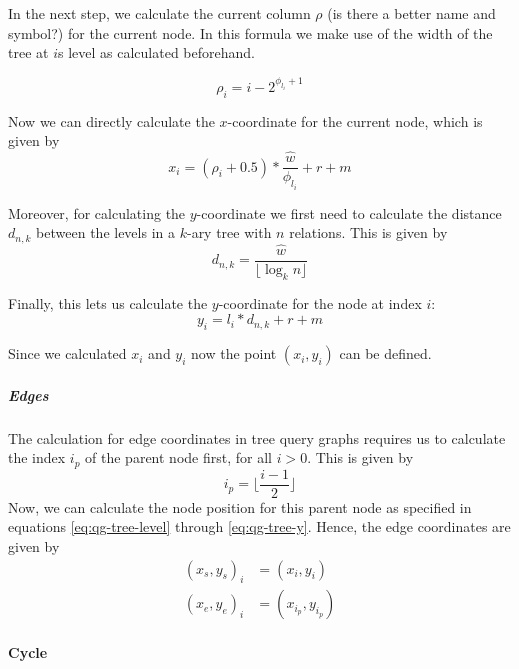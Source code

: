 In the next step, we calculate the current column $\rho$ (is there a better name and symbol?) for the current node. In this formula we make use of the width of the tree at $i$s level as calculated beforehand.

\begin{equation}
    \rho_{i} = i - 2^{\phi_{l_i} + 1}
\end{equation}

Now we can directly calculate the $x$-coordinate for the current node, which is given by
\begin{equation}
    x_i = (\rho_{i} + 0.5) * \frac{\hat{w}}{\phi_{l_i}} + r + m
\end{equation}

Moreover, for calculating the $y$-coordinate we first need to calculate the distance $d_{n,k}$ between the levels in a $k$-ary tree with $n$ relations. This is given by
\begin{equation}
    d_{n,k} = \frac{\hat{w}}{\lfloor \log_k{n} \rfloor}
\end{equation}

Finally, this lets us calculate the $y$-coordinate for the node at index $i$:
\begin{equation}
    \label{eq:qg-tree-y}
    y_i = l_i * d_{n,k} + r + m
\end{equation}

Since we calculated $x_i$ and $y_i$ now the point $(x_i, y_i)$ can be defined.

\subparagraph{Edges}
The calculation for edge coordinates in tree query graphs requires us to calculate the index $i_p$ of the parent node first, for all $i > 0$. This is given by 
\begin{equation}
    i_p = \lfloor \frac{i-1}{2} \rfloor
\end{equation}
Now, we can calculate the node position for this parent node as specified in equations \ref{eq:qg-tree-level} through \ref{eq:qg-tree-y}. Hence, the edge coordinates are given by 
\begin{equation}
    \begin{aligned}
        (x_s, y_s)_i &= (x_i, y_i)\\   
        (x_e, y_e)_i &= (x_{i_p}, y_{i_p})
    \end{aligned}
\end{equation}

\paragraph{Cycle} 

